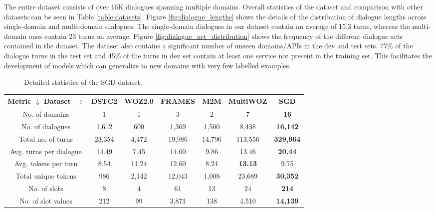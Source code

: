The entire dataset consists of over 16K dialogues spanning multiple domains. Overall statistics of the dataset and comparison with other datasets can be seen in Table \ref{table:datasets}. Figure \ref{fig:dialogue_lengths} shows the details of the distribution of dialogue lengths across single-domain and multi-domain dialogues. The single-domain dialogues in our dataset contain an average of 15.3 turns, whereas the multi-domain ones contain 23 turns on average. Figure \ref{fig:dialogue_act_distribution} shows the frequency of the different dialogue acts contained in the dataset. The dataset also contains a significant number of unseen domains/APIs in the dev and test sets. 77\% of the dialogue turns in the test set and 45\% of the turns in dev set contain at least one service not present in the training set. This facilitates the development of models which can generalize to new domains with very few labelled examples.

\begin{figure}
    \centering
     \qquad
\caption{Detailed statistics of the SGD dataset.}
\end{figure}

\begin{table*}[t!]
\centering
    \begin{tabular}[t]{ c | c c c c c c }

    \textbf{Metric $\downarrow$ Dataset $\rightarrow$} & \textbf{DSTC2} & \textbf{WOZ2.0} & \textbf{FRAMES} & \textbf{M2M} & \textbf{MultiWOZ} & \textbf{SGD} \\\hline
    No. of domains & 1 & 1 & 3 & 2 & 7 & \textbf{16}\\
    No. of dialogues &  1,612 & 600 & 1,369 & 1,500 & 8,438 & \textbf{16,142}\\
    Total no. of turns &  23,354 & 4,472 & 19,986 & 14,796 & 113,556 & \textbf{329,964}\\
    Avg. turns per dialogue & 14.49 & 7.45 & 14.60 & 9.86 & 13.46 & \textbf{20.44} \\
    Avg. tokens per turn & 8.54 & 11.24 & 12.60 & 8.24 & \textbf{13.13} & 9.75\\
    Total unique tokens & 986 & 2,142 & 12,043 & 1,008 & 23,689 & \textbf{30,352}\\
    No. of slots &  8 & 4 & 61 & 13 & 24 & \textbf{214}\\
    No. of slot values & 212 & 99 & 3,871 & 138 & 4,510 & \textbf{14,139}\\

    \end{tabular}
    \caption{Comparison of our SGD dataset to existing related datasets for task-oriented dialogue. Note that the numbers reported are for the training portions for all datasets except FRAMES, where the numbers for the complete dataset are reported.}
    \label{table:datasets}
\end{table*}


